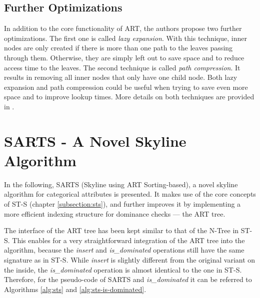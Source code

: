 \subsection{Further Optimizations} \label{section:art-further-optimizations}
In addition to the core functionality of ART, the authors propose two further optimizations. The first one is called \textit{lazy expansion}. With this technique, inner nodes are only created if there is more than one path to the leaves passing through them. Otherwise, they are simply left out to save space and to reduce access time to the leaves. The second technique is called \textit{path compression}. It results in removing all inner nodes that only have one child node. %
Both lazy expansion and path compression could be useful when trying to save even more space and to improve lookup times. More details on both techniques are provided in \cite{art}. 

\section{SARTS - A Novel Skyline Algorithm} \label{section:sarts}
In the following, SARTS (Skyline using ART Sorting-based), a novel skyline algorithm for categorical attributes is presented. It makes use of the core concepts of ST-S (chapter \ref{subsection:sts}), and further improves it by implementing a more efficient indexing structure for dominance checks --- the ART tree. 

The interface of the ART tree has been kept similar to that of the N-Tree in ST-S. This enables for a very straightforward integration of the ART tree into the algorithm, because the \textit{insert} and \textit{is\_dominated} operations still have the same signature as in ST-S. While \textit{insert} is slightly different from the original variant on the inside, the \textit{is\_dominated} operation is almost identical to the one in ST-S. Therefore, for the pseudo-code of SARTS and \textit{is\_dominated} it can be referred to Algorithms \ref{alg:sts} and \ref{alg:sts-is-dominated}. 

